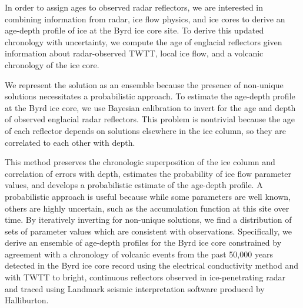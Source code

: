 


In order to assign ages to observed radar reflectors, we are interested in combining information from radar, ice flow physics, and ice cores to derive an age-depth profile of ice at the Byrd ice core site. To derive this updated chronology with uncertainty, we compute the age of englacial reflectors given information about radar-observed TWTT, local ice flow, and a volcanic chronology of the ice core.

We represent the solution as an ensemble because the presence of non-unique solutions necessitates a probabilistic approach. To estimate the age-depth profile at the Byrd ice core, we use Bayesian calibration to invert for the age and depth of observed englacial radar reflectors. This problem is nontrivial because the age of each reflector depends on solutions elsewhere in the ice column, so they are correlated to each other with depth. 

This method preserves the chronologic superposition of the ice column and correlation of errors with depth, estimates the probability of ice flow parameter values, and develops a probabilistic estimate of the age-depth profile. A probabilistic approach is useful because while some parameters are well known, others are highly uncertain, such as the accumulation function at this site over time. By iteratively inverting for non-unique solutions, we find a distribution of sets of parameter values which are consistent with observations. Specifically, we derive an ensemble of age-depth profiles for the Byrd ice core constrained by agreement with a chronology of volcanic events from the past 50,000 years detected in the Byrd ice core record using the electrical conductivity method \citep{hammer1997} and with TWTT to bright, continuous reflectors observed in ice-penetrating radar \citep{holt2006,young2012,morse2002} and traced using Landmark seismic interpretation software produced by Halliburton.


